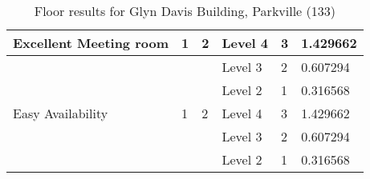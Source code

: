 \begin{table}[H]
{\begin{tabular}{|l|l|l|l|l|l|}
Excellent Meeting room & 1                       & 2                                & Level 4              & 3             & 1.429662        \\ \hline
                      &                         &                                  & Level 3              & 2             & 0.607294        \\ \hline
                      &                         &                                  & Level 2              & 1             & 0.316568        \\ \hline
Easy Availability      & 1                       & 2                                & Level 4              & 3             & 1.429662        \\ \hline
                      &                         &                                  & Level 3              & 2             & 0.607294        \\ \hline
                      &                         &                                  & Level 2              & 1             & 0.316568        \\ \hline
\end{tabular}
}
\caption{Floor results for Glyn Davis Building, Parkville (133)}
\label{appendix:glyn_mr_floor}
\end{table}




